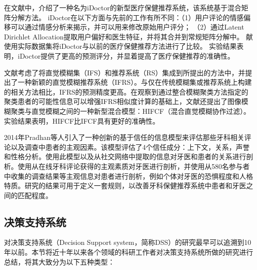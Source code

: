在文献\parencite{Zhang2017iDoctor}中，介绍了一种名为iDoctor的新型医疗保健推荐系统，该系统基于混合矩阵分解方法。 iDoctor在以下方面与先前的工作有所不同：（1）用户评论的情感偏移可以通过情感分析来揭示，并可以用来修改原始用户评分； （2）通过Latent Dirichlet Allocation提取用户偏好和医生特征，并将其合并到常规矩阵分解中。 献\parencite{Zhang2017iDoctor}使用实际数据集将iDoctor与以前的医疗保健推荐方法进行了比较。 实验结果表明，iDoctor提供了更高的预测评分，并显着提高了医疗保健推荐的准确性。

文献\parencite{Thong2015HIFCF}考虑了将直觉模糊集（IFS）和推荐系统（RS）集成到所提出的方法中，并提出了一种新颖的直觉模糊推荐系统（IFRS）。与仅在传统模糊集或推荐系统上构建的相关方法相比，IFRS的预测精度更高。在观察到通过整合模糊聚类方法指定的聚类患者的可能性信息可以增强IFRS相似度计算的基础上，文献\parencite{Thong2015HIFCF}还提出了图像模糊聚类与直觉模糊之间的一种新型混合模型：HIFCF（混合直觉模糊协作过滤）。实验结果表明，HIFCF比IFCF具有更好的准确性。

2014年Pradhan等人\cite{Pradhan2014Improving}引入了一种创新的基于信任的信息模型来评估那些牙科相关评论以及调查中患者的主观因素。该模型评估了4个信任成分：上下文，关系，声誉和性格分析。使用此模型以及从社交网络中提取的信息对牙医和患者的关系进行剖析。使用从在线牙科评论获得的主观素质对牙医进行剖析，并使用从580名参与者中收集的调查结果等主观信息对患者进行剖析，例如个体对牙医的恐惧程度和人格特质。研究的结果可用于定义一套规则，以改善牙科保健推荐系统中患者和牙医之间的匹配程度。


\subsection{决策支持系统}
对决策支持系统（Decision Support system，简称DSS）的研究最早可以追溯到10年以前\cite{Filip2017}。本节将近十年以来各个领域的科研工作者对决策支持系统所做的研究进行总结，将其大致分为以下五种类型：

